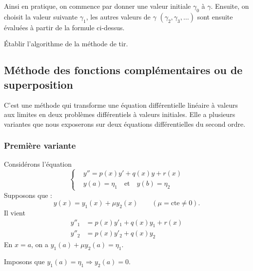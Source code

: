 Ainsi en pratique, on commence par donner une valeur initiale $\gamma_0$ à
$\gamma$. Ensuite, on choisit la valeur suivante $\gamma_1$, les autres valeurs
de $\gamma$ $(\gamma_2, \gamma_3, \dots)$ sont ensuite évaluées à partir de la
formule ci-dessus.

\begin{exercice}
Établir l'algorithme de la méthode de tir.
\end{exercice}

\subsection{Méthode des fonctions complémentaires ou de superposition}

C'est une méthode qui transforme une équation différentielle linéaire à
valeurs aux limites en deux problèmes différentiels à valeurs initiales. Elle a
plusieurs variantes que nous exposerons sur deux équations différentielles du
second ordre.

\subsubsection{Première variante}

Considérons l'équation
\[
  \left\{
  \begin{aligned}
    &y'' = p(x)y' + q(x)y + r(x)\\
    &y(a) = \eta_1 \quad\text{et}\quad y(b) = \eta_2
  \end{aligned}
  \right.
\]
Supposons que :
\[
  y(x) = y_1(x) + \mu y_2(x) \qquad (\mu = \text{cte} \neq 0).
\]
Il vient
\[
  \begin{aligned}
    y''_1 &= p(x)y'_1 + q(x)y_1 + r(x)\\
    y''_2 &= p(x)y'_2 + q(x)y_2
  \end{aligned}
\]
En $x = a$, on a $y_1(a) + \mu y_2(a) = \eta_1$.

Imposons que $y_1(a) = \eta_1 \Longrightarrow y_2(a) = 0$.

